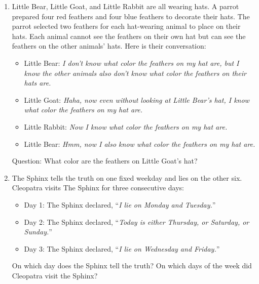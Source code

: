 \begin{enumerate}
    \item Little Bear,  Little Goat,  and Little Rabbit are all wearing hats. A parrot prepared four red feathers and four blue feathers to decorate their hats. The parrot selected two feathers for each hat-wearing animal to place on their hats. Each animal cannot see the feathers on their own hat but can see the feathers on the other animals' hats. Here is their conversation:
    \begin{itemize}
        \item Little Bear: \textit{I don't know what color the feathers on my hat are,  but I know the other animals also don't know what color the feathers on their hats are.}
        \item Little Goat: \textit{Haha,  now even without looking at Little Bear's hat,  I know what color the feathers on my hat are.}
        \item Little Rabbit: \textit{Now I know what color the feathers on my hat are.}
        \item Little Bear: \textit{Hmm,  now I also know what color the feathers on my hat are.}
    \end{itemize}
    Question: What color are the feathers on Little Goat's hat?
    
    \item The Sphinx tells the truth on one fixed weekday and lies on the other six. Cleopatra visits The Sphinx for three consecutive days:
    \begin{itemize}
        \item Day 1: The Sphinx declared,  ``\textit{I lie on Monday and Tuesday.}''
        \item Day 2: The Sphinx declared,  ``\textit{Today is either Thursday,  or Saturday,  or Sunday.}''
        \item Day 3: The Sphinx declared,  ``\textit{I lie on Wednesday and Friday.}''
    \end{itemize}
    On which day does the Sphinx tell the truth? On which days of the week did Cleopatra visit the Sphinx?
\end{enumerate}